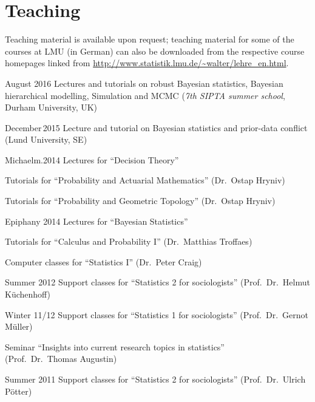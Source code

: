 \documentclass[a4paper]{simplecv}
\begin{document}
\section{Teaching}
\label{teaching}
Teaching material is available upon request;
teaching material for some of the courses at LMU (in German) can also be downloaded from the respective course homepages
linked from \url{http://www.statistik.lmu.de/~walter/lehre_en.html}.
\begin{topic}
\item[August 2016] Lectures and tutorials on robust Bayesian statistics, Bayesian hierarchical modelling, Simulation and MCMC
(\emph{7th SIPTA summer school}, Durham University, UK)
\item[December\,2015] Lecture and tutorial on Bayesian statistics and prior-data conflict (Lund University, SE) 
\item[Michaelm.2014] Lectures for ``Decision Theory''

                    Tutorials for ``Probability and Actuarial Mathematics'' (Dr.\ Ostap Hryniv)

                    Tutorials for ``Probability and Geometric Topology'' (Dr.\ Ostap Hryniv)

\item[Epiphany 2014] Lectures for ``Bayesian Statistics''

                    Tutorials for ``Calculus and Probability I'' (Dr.\ Matthias Troffaes)

                    Computer classes for ``Statistics I'' (Dr.\ Peter Craig) 

\item[Summer 2012]  Support classes for ``Statistics 2 for sociologists'' (Prof.\ Dr.\ Helmut K\"{u}chenhoff)

\item[Winter 11/12] Support classes for ``Statistics 1 for sociologists'' (Prof.\ Dr.\ Gernot M\"{u}ller)

                    Seminar ``Insights into current research topics in statistics''\\ (Prof.\ Dr.\ Thomas Augustin)
                    
\item[Summer 2011]  Support classes for ``Statistics 2 for sociologists'' (Prof.\ Dr.\ Ulrich P\"{o}tter)


\end{topic}
\end{document}
